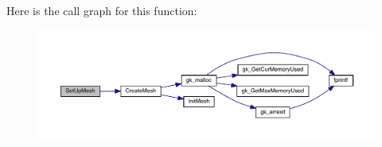 Here is the call graph for this function\+:\nopagebreak
\begin{figure}[H]
\begin{center}
\leavevmode
\includegraphics[width=350pt]{a00380_a9f9b575b1270719a1d7ae34f89ed2dc5_cgraph}
\end{center}
\end{figure}
